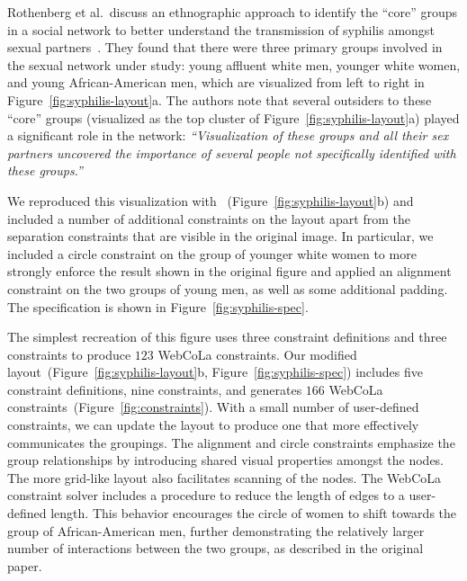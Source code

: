 Rothenberg et al.\ discuss an ethnographic approach to identify the
``core'' groups in a social network to better understand the transmission
of syphilis amongst sexual partners~\cite{rothenberg1998using}. They found
that there were three primary groups involved in the sexual network under study:
young affluent white men, younger white women, and young African-American men,
which are visualized from left to right in Figure~\ref{fig:syphilis-layout}a. 
The authors note that several outsiders to these ``core'' groups
(visualized as the top cluster of Figure~\ref{fig:syphilis-layout}a) 
played a significant role in the network:
\emph{``Visualization of these groups and all their sex
  partners uncovered the importance of several people not specifically
  identified with these groups.''}

We reproduced this visualization with \projectname~(Figure~\ref{fig:syphilis-layout}b) 
and included a number of additional constraints on the layout apart
from the separation constraints that are visible in the original image. In
particular, we included a circle constraint on the group of younger white
women to more strongly enforce the result shown in the original figure and
applied an alignment constraint on the two groups of young
men, as well as some additional padding. The \projectname specification
is shown in Figure~\ref{fig:syphilis-spec}.

The simplest recreation of this figure uses three constraint
definitions and three \projectname constraints to produce
$123$ WebCoLa constraints.
Our modified layout~(Figure~\ref{fig:syphilis-layout}b, Figure~\ref{fig:syphilis-spec})  
includes five constraint definitions, nine \projectname constraints, and generates 
$166$ WebCoLa constraints~(Figure~\ref{fig:constraints}). With a small 
number of user-defined constraints, we can update the layout to produce
one that more effectively communicates the groupings. The
alignment and circle constraints emphasize the group relationships by
introducing shared visual properties amongst the nodes. The more grid-like
layout also facilitates scanning of the nodes. The
WebCoLa constraint solver includes a procedure to reduce the length of
edges to a user-defined length. This behavior encourages the circle of women
to shift towards the group of African-American men, further demonstrating
the relatively larger number of interactions between the two groups,
as described in the original paper.

